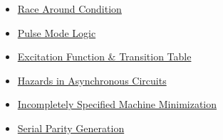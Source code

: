 \documentclass[12pt,a3paper]{article}
\begin{document}
\begin{tcolorbox}[breakable,colback=cE!5,colframe=cE,boxrule=1pt,arc=5pt,
  left=8pt,right=8pt,top=8pt,bottom=8pt,before skip=4pt]
\begin{itemize}[leftmargin=1.2em,itemsep=1pt,label={\textcolor{cE}{$\triangleright$}}]
\begin{itemize}[leftmargin=1.5em,itemsep=0pt,label={\textcolor{cE}{$\cdot$}}]
        \item \hyperref[sub:s6-race]{Race Around Condition}
        \item \hyperref[sub:s6-pulse]{Pulse Mode Logic}
        \item \hyperref[sub:s6-excitation]{Excitation Function \& Transition Table}
        \item \hyperref[sub:s6-hazards]{Hazards in Asynchronous Circuits}
        \item \hyperref[sub:s6-incomp]{Incompletely Specified Machine Minimization}
        \item \hyperref[sub:s6-parity]{Serial Parity Generation}
      \end{itemize}
  \end{itemize}
\end{tcolorbox}
\end{document}

